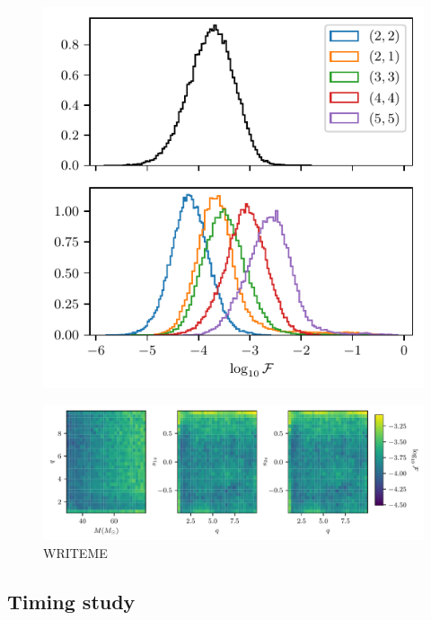 \documentclass[twocolumn,showpacs,preprintnumbers,nofootinbib,prd,
superscriptaddress,10pt]{revtex4-1}
\begin{document}
\begin{figure}[t]
	\centering
	\includegraphics[scale = 1]{accuracy}
	\caption{}
	\label{fig:accuracy_hist}
\end{figure}

\begin{figure}[t]
	\centering
	\includegraphics[width=\textwidth]{colormesh}
	\caption{WRITEME}
	\label{fig:countour_plots}
\end{figure}

\subsection{Timing study}
\label{sec:timing}
\end{document}

